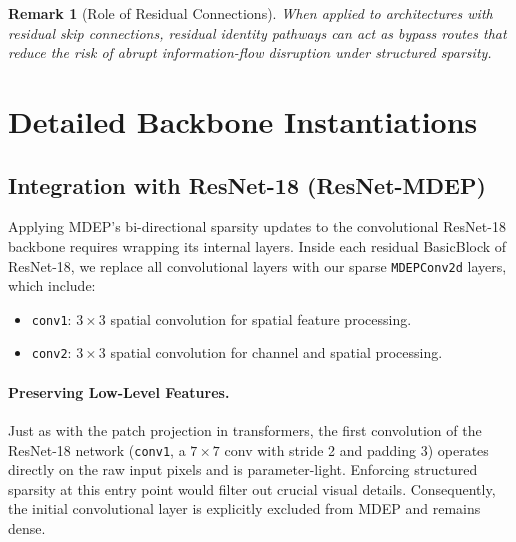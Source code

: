 \documentclass[letterpaper]{article} %
\newtheorem{remark}{Remark}
\begin{document}
\begin{remark}[Role of Residual Connections]
When applied to architectures with residual skip connections, residual identity pathways can act as bypass routes that reduce the risk of abrupt information-flow disruption under structured sparsity.
\end{remark}


\section{Detailed Backbone Instantiations}
\subsection{Integration with ResNet-18 (ResNet-MDEP)}\label{subsec:resnet}

Applying MDEP's bi-directional sparsity updates to the convolutional ResNet-18 backbone requires wrapping its internal layers. Inside each residual BasicBlock of ResNet-18, we replace all convolutional layers with our sparse \texttt{MDEPConv2d} layers, which include:
\begin{itemize}
    \item \texttt{conv1}: $3 \times 3$ spatial convolution for spatial feature processing.
    \item \texttt{conv2}: $3 \times 3$ spatial convolution for channel and spatial processing.
\end{itemize}

\paragraph{Preserving Low-Level Features.}
Just as with the patch projection in transformers, the first convolution of the ResNet-18 network (\texttt{conv1}, a $7 \times 7$ conv with stride 2 and padding 3) operates directly on the raw input pixels and is parameter-light. Enforcing structured sparsity at this entry point would filter out crucial visual details. Consequently, the initial convolutional layer is explicitly excluded from MDEP and remains dense.
\end{document}
